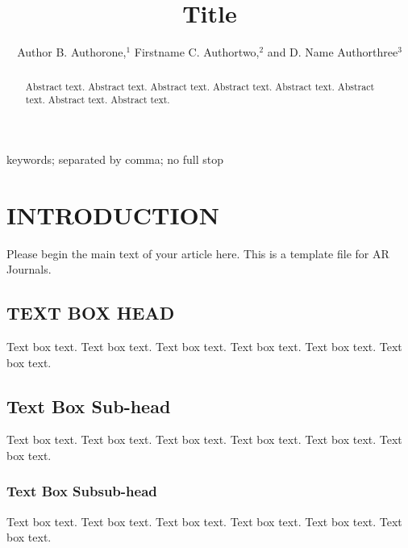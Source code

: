 \documentclass{ar-1col}
\begin{document}

\title{Title}


\author{Author B. Authorone,$^1$ Firstname C. Authortwo,$^2$ and D. Name Authorthree$^3$
}

\begin{abstract}
Abstract text. Abstract text.   Abstract text. Abstract text. Abstract text. Abstract text. Abstract text. Abstract text. 
\end{abstract}

\begin{keywords}
keywords; separated by comma; no full stop
\end{keywords}
\maketitle

\tableofcontents


\section{INTRODUCTION}
Please begin the main text of your article here. This is a template file for AR Journals.

\begin{textbox}
\section{TEXT BOX HEAD}
Text box text. Text box text. Text box text. Text box text. Text box text. Text box text.
\subsection{Text Box Sub-head}
Text box text. Text box text. Text box text. Text box text. Text box text. Text box text.
\subsubsection{Text Box Subsub-head}
Text box text. Text box text. Text box text. Text box text. Text box text. Text box text.
\end{textbox}
\end{document}
